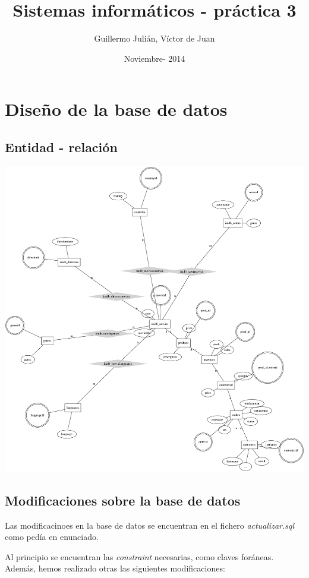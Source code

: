 \documentclass[nochap]{apuntes}
\title{Sistemas informáticos - práctica 3}
\author{Guillermo Julián, Víctor de Juan}
\date{Noviembre- 2014}
\begin{document}
\pagestyle{plain}
\maketitle

\tableofcontents
\newpage

\section{Diseño de la base de datos}
\subsection{Entidad - relación}
\includegraphics[scale=0.2]{ER.png}

\subsection{Modificaciones sobre la base de datos}

Las modificacinoes en la base de datos se encuentran en el fichero \textit{actualizar.sql} como pedía en enunciado.


Al principio se encuentran las \textit{constraint} necesarias, como claves foráneas. Además, hemos realizado otras las siguientes modificaciones:
\end{document}
